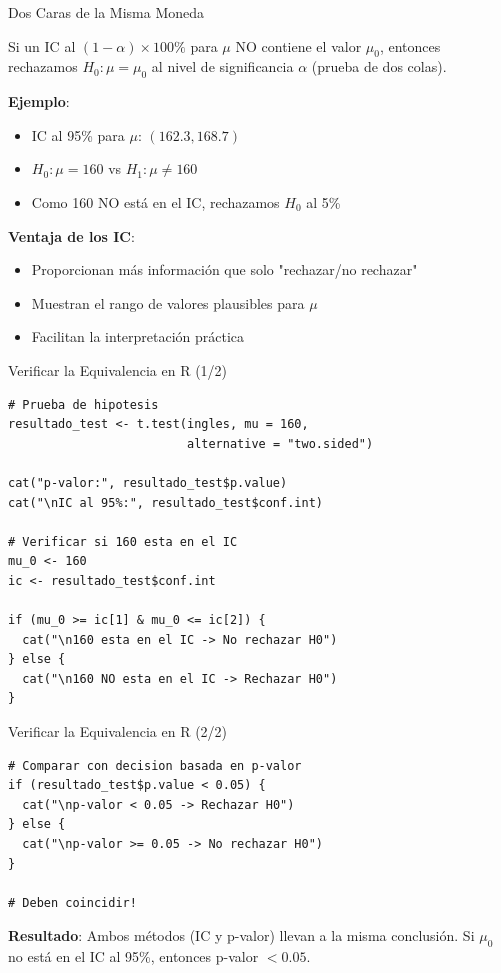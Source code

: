 \documentclass[aspectratio=169, 11pt]{beamer}
\begin{document}
\begin{frame}{Dos Caras de la Misma Moneda}
\begin{theorem}
Si un IC al $(1-\alpha) \times 100\%$ para $\mu$ \alert{NO contiene} el valor $\mu_0$, entonces rechazamos $H_0: \mu = \mu_0$ al nivel de significancia $\alpha$ (prueba de dos colas).
\end{theorem}

\vspace{0.3cm}
\textbf{Ejemplo}:
\begin{itemize}
  \item IC al 95\% para $\mu$: $(162.3, 168.7)$
  \item $H_0: \mu = 160$ vs $H_1: \mu \neq 160$
  \item Como 160 NO está en el IC, rechazamos $H_0$ al 5\%
\end{itemize}

\vspace{0.3cm}
\textbf{Ventaja de los IC}:
\begin{itemize}
  \item Proporcionan más información que solo "rechazar/no rechazar"
  \item Muestran el rango de valores plausibles para $\mu$
  \item Facilitan la interpretación práctica
\end{itemize}
\end{frame}

\begin{frame}[fragile]{Verificar la Equivalencia en R (1/2)}
\begin{lstlisting}
# Prueba de hipotesis
resultado_test <- t.test(ingles, mu = 160,
                         alternative = "two.sided")

cat("p-valor:", resultado_test$p.value)
cat("\nIC al 95%:", resultado_test$conf.int)

# Verificar si 160 esta en el IC
mu_0 <- 160
ic <- resultado_test$conf.int

if (mu_0 >= ic[1] & mu_0 <= ic[2]) {
  cat("\n160 esta en el IC -> No rechazar H0")
} else {
  cat("\n160 NO esta en el IC -> Rechazar H0")
}
\end{lstlisting}
\end{frame}

\begin{frame}[fragile]{Verificar la Equivalencia en R (2/2)}
\begin{lstlisting}
# Comparar con decision basada en p-valor
if (resultado_test$p.value < 0.05) {
  cat("\np-valor < 0.05 -> Rechazar H0")
} else {
  cat("\np-valor >= 0.05 -> No rechazar H0")
}

# Deben coincidir!
\end{lstlisting}

\vspace{0.3cm}
\textbf{Resultado}: Ambos métodos (IC y p-valor) llevan a la \alert{misma conclusión}. Si $\mu_0$ no está en el IC al 95\%, entonces p-valor $< 0.05$.
\end{frame}
\end{document}
